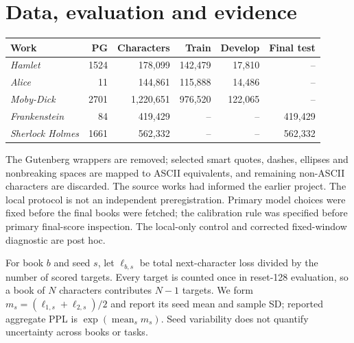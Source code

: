 \documentclass[11pt,letterpaper]{article}
\begin{document}
\section{Data, evaluation and evidence}\label{app:data}
\begin{center}\begin{minipage}{\textwidth}\centering\small
{}

\begin{tabular}{lrrrrr}\toprule
Work & PG & Characters & Train & Develop & Final test\\\midrule
\emph{Hamlet} & 1524 & 178,099 & 142,479 & 17,810 & -- \\
\emph{Alice} & 11 & 144,861 & 115,888 & 14,486 & -- \\
\emph{Moby-Dick} & 2701 & 1,220,651 & 976,520 & 122,065 & -- \\
\emph{Frankenstein} & 84 & 419,429 & -- & -- & 419,429 \\
\emph{Sherlock Holmes} & 1661 & 562,332 & -- & -- & 562,332 \\
\bottomrule\end{tabular}


\end{minipage}\end{center}

The Gutenberg wrappers are removed; selected smart quotes, dashes, ellipses and nonbreaking spaces are mapped to ASCII equivalents, and remaining non-ASCII characters are discarded. The source works had informed the earlier project. The local protocol is not an independent preregistration. Primary model choices were fixed before the final books were fetched; the calibration rule was specified before primary final-score inspection. The local-only control and corrected fixed-window diagnostic are post hoc.

For book $b$ and seed $s$, let $\ell_{b,s}$ be total next-character loss divided by the number of scored targets. Every target is counted once in reset-128 evaluation, so a book of $N$ characters contributes $N-1$ targets. We form $m_s=(\ell_{1,s}+\ell_{2,s})/2$ and report its seed mean and sample SD; reported aggregate PPL is $\exp(\operatorname{mean}_s m_s)$. Seed variability does not quantify uncertainty across books or tasks.
\end{document}
